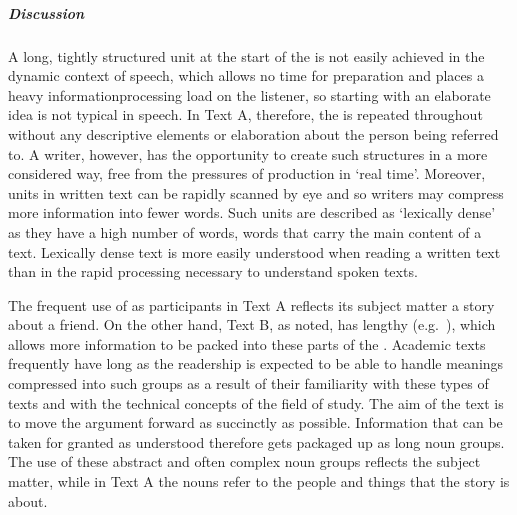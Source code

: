 \documentclass[letterpaper,10pt,english]{sphinxmanual}
\begin{document}
\subparagraph{Discussion}
\label{\detokenize{content/session_00/Part_00_05:Discussion}}
A long, tightly structured unit at the start of the  is not easily achieved in the dynamic context of speech, which allows no time for preparation and places a heavy information\sphinxhyphen{}processing load on the listener, so starting with an elaborate idea is not typical in speech. In Text A, therefore, the  is repeated throughout without any descriptive elements or elaboration about the person being referred to. A writer, however, has the opportunity to create such structures in
a more considered way, free from the pressures of production in ‘real time’. Moreover, units in written text can be rapidly scanned by eye and so writers may compress more information into fewer words. Such units are described as ‘lexically dense’ as they have a high number of  words, words that carry the main content of a text. Lexically dense text is more easily understood when reading a written text than in the rapid processing necessary to understand spoken texts.

The frequent use of  as participants in Text A reflects its subject matter \textendash{} a story about a friend. On the other hand, Text B, as noted, has lengthy  (e.g. ), which allows more information to be packed into these parts of the . Academic texts frequently have long  as the readership is expected to be able to handle meanings compressed into
such groups as a result of their familiarity with these types of texts and with the technical concepts of the field of study. The aim of the text is to move the argument forward as succinctly as possible. Information that can be taken for granted as understood therefore gets packaged up as long noun groups. The use of these abstract and often complex noun groups reflects the subject matter, while in Text A the nouns refer to the people and things that the story is about.
\end{document}
